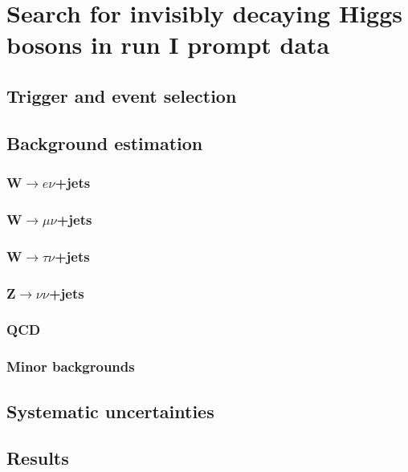 \chapter{Search for invisibly decaying Higgs bosons in run I prompt data}
\label{chap:prompt}

\section{Trigger and event selection}%
\label{sec:promptsel}

\section{Background estimation}%
\label{sec:promptbkg}

\subsection{W$\rightarrow e\nu$+jets}%
\label{sec:promptwenu}

\subsection{W$\rightarrow \mu\nu$+jets}%
\label{sec:promptwmunu}

\subsection{W$\rightarrow \tau\nu$+jets}%
\label{sec:promptwtaunu}

\subsection{Z$\rightarrow \nu\nu$+jets}%
\label{sec:promptznunu}

\subsection{QCD}%
\label{sec:promptQCD}

\subsection{Minor backgrounds}%
\label{sec:promptminor}

\section{Systematic uncertainties}%
\label{sec:promptsyst}

\section{Results}%
\label{sec:promptresults}
